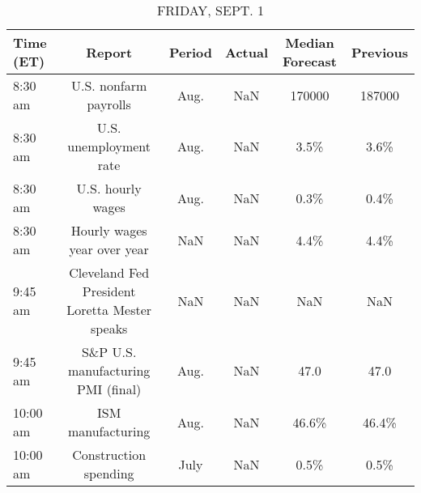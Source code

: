 \documentclass{article}%
\begin{document}
\begin{table}[htbp]%
\caption{FRIDAY, SEPT. 1}%
\centering%
\begin{adjustbox}{width=1\textwidth}%
\begin{tabular}{lccccc}
\toprule
Time (ET) &                                        Report & Period & Actual & Median Forecast & Previous \\
\midrule
  8:30 am &                         U.S. nonfarm payrolls &   Aug. &    NaN &          170000 &   187000 \\
  8:30 am &                        U.S. unemployment rate &   Aug. &    NaN &            3.5\% &     3.6\% \\
  8:30 am &                             U.S. hourly wages &   Aug. &    NaN &            0.3\% &     0.4\% \\
  8:30 am &                   Hourly wages year over year &    NaN &    NaN &            4.4\% &     4.4\% \\
  9:45 am & Cleveland Fed President Loretta Mester speaks &    NaN &    NaN &             NaN &      NaN \\
  9:45 am &            S\&P U.S. manufacturing PMI (final) &   Aug. &    NaN &            47.0 &     47.0 \\
 10:00 am &                             ISM manufacturing &   Aug. &    NaN &           46.6\% &    46.4\% \\
 10:00 am &                         Construction spending &   July &    NaN &            0.5\% &     0.5\% \\
\bottomrule
\end{tabular}
%
\end{adjustbox}%
\end{table}
\end{document}
